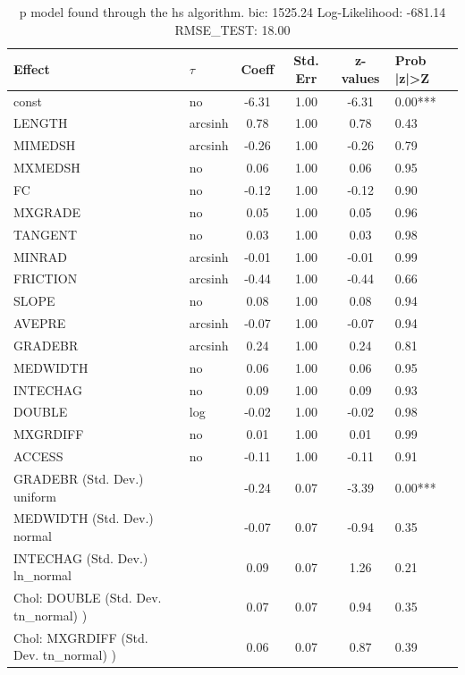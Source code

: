 \begin{table}
	\caption{p model found through the hs algorithm. bic: 1525.24 Log-Likelihood: -681.14 RMSE_TEST: 18.00}
	\begin{center}
		\begin{tabular}{|l|l|c|c|c|l|}
			\hline
			Effect & $\tau$ & Coeff & Std. Err & z-values & Prob |z|>Z \\
			\hline
			const & no & -6.31 & 1.00 & -6.31 & 0.00*** \\
			\hline
			LENGTH & arcsinh & 0.78 & 1.00 & 0.78 & 0.43 \\
			\hline
			MIMEDSH & arcsinh & -0.26 & 1.00 & -0.26 & 0.79 \\
			\hline
			MXMEDSH & no & 0.06 & 1.00 & 0.06 & 0.95 \\
			\hline
			FC & no & -0.12 & 1.00 & -0.12 & 0.90 \\
			\hline
			MXGRADE & no & 0.05 & 1.00 & 0.05 & 0.96 \\
			\hline
			TANGENT & no & 0.03 & 1.00 & 0.03 & 0.98 \\
			\hline
			MINRAD & arcsinh & -0.01 & 1.00 & -0.01 & 0.99 \\
			\hline
			FRICTION & arcsinh & -0.44 & 1.00 & -0.44 & 0.66 \\
			\hline
			SLOPE & no & 0.08 & 1.00 & 0.08 & 0.94 \\
			\hline
			AVEPRE & arcsinh & -0.07 & 1.00 & -0.07 & 0.94 \\
			\hline
			GRADEBR & arcsinh & 0.24 & 1.00 & 0.24 & 0.81 \\
			\hline
			MEDWIDTH & no & 0.06 & 1.00 & 0.06 & 0.95 \\
			\hline
			INTECHAG & no & 0.09 & 1.00 & 0.09 & 0.93 \\
			\hline
			DOUBLE & log & -0.02 & 1.00 & -0.02 & 0.98 \\
			\hline
			MXGRDIFF & no & 0.01 & 1.00 & 0.01 & 0.99 \\
			\hline
			ACCESS & no & -0.11 & 1.00 & -0.11 & 0.91 \\
			\hline
			GRADEBR (Std. Dev.) uniform &  & -0.24 & 0.07 & -3.39 & 0.00*** \\
			\hline
			MEDWIDTH (Std. Dev.) normal &  & -0.07 & 0.07 & -0.94 & 0.35 \\
			\hline
			INTECHAG (Std. Dev.) ln_normal &  & 0.09 & 0.07 & 1.26 & 0.21 \\
			\hline
			 Chol: DOUBLE (Std. Dev. tn_normal) ) &  & 0.07 & 0.07 & 0.94 & 0.35 \\
			\hline
			 Chol: MXGRDIFF (Std. Dev. tn_normal) ) &  & 0.06 & 0.07 & 0.87 & 0.39 \\

\end{tabular}
\end{center}
\end{table}
